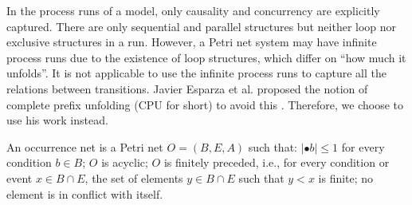 \documentclass{llncs}
\begin{document}
In the process runs of a model, only causality and concurrency are explicitly captured. There are only sequential and parallel structures but neither loop nor exclusive structures in a run. However, a Petri net system may have infinite process runs due to the existence of loop structures, which differ on ``how much it unfolds''. It is not applicable to use the infinite process runs to capture all the relations between transitions. Javier Esparza et al. proposed the notion of complete prefix unfolding (CPU for short) to avoid this \cite{esparza2002improvement}. Therefore, we choose to use his work instead.

\begin{definition}\label{def:occurrenceNet}
An occurrence net is a Petri net $O=(B,E,A)$ such that: $|\bullet b|\leq 1$ for every condition $b\in B$; $O$ is acyclic; $O$ is finitely preceded, i.e., for every condition or event $x\in B\cap E$, the set of elements $y\in B\cap E$ such that $y<x$ is finite; no element is in conflict with itself.
\end{definition}

\end{document}
